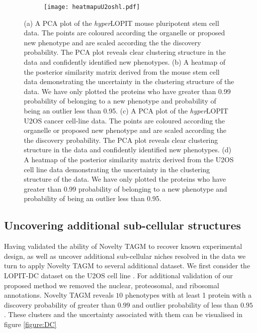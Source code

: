 \documentclass[12pt,english]{article}
\begin{document}
\begin{figure}[ht]
\begin{subfigure}[t]{0.5\textwidth}
	\centering
	\texttt{[image: heatmapuU2oshl.pdf]}
	\caption{}
\end{subfigure}
	\caption{(a) A PCA plot of the \textit{hyper}LOPIT mouse pluripotent stem cell data. The points are coloured according the organelle or proposed new phenotype and are scaled according the the discovery probability. The PCA plot reveals clear clustering structure in the data and confidently identified new phenotypes. (b) A heatmap of the posterior similarity matrix derived from the mouse stem cell data demonstrating the uncertainty in the clustering structure of the data. We have only plotted the proteins who have greater than 0.99 probability of belonging to a new phenotype and probability of being an outlier less than 0.95. (c) A PCA plot of the \textit{hyper}LOPIT U2OS cancer cell-line data. The points are coloured according the organelle or proposed new phenotype and are scaled according the the discovery probability. The PCA plot reveals clear clustering structure in the data and confidently identified new phenotypes. (d)  A heatmap of the posterior similarity matrix derived from the U2OS cell line data demonstrating the uncertainty in the clustering structure of the data. We have only plotted the proteins who have greater than 0.99 probability of belonging to a new phenotype and probability of being an outlier less than 0.95.}
	\label{figure:mouse}
\end{figure}
\clearpage
\subsection{Uncovering additional sub-cellular structures}
Having validated the ability of Novelty TAGM to recover known experimental design, as well as uncover additional sub-cellular niches resolved in the data we turn to apply Novelty TAGM to several additional dataset. We first consider the LOPIT-DC dataset on the U2OS cell line \citep{DC:2018}. For additional validation of our proposed method we removed the nuclear, proteosomal, and ribosomal annotations. Novelty TAGM reveals $10$ phenotypes with at least 1 protein with a discovery probability of greater than $0.99$ and outlier probability of less than $0.95$. These clusters and the uncertainty associated with them can be visualised in figure \ref{figure:DC}
\end{document}
